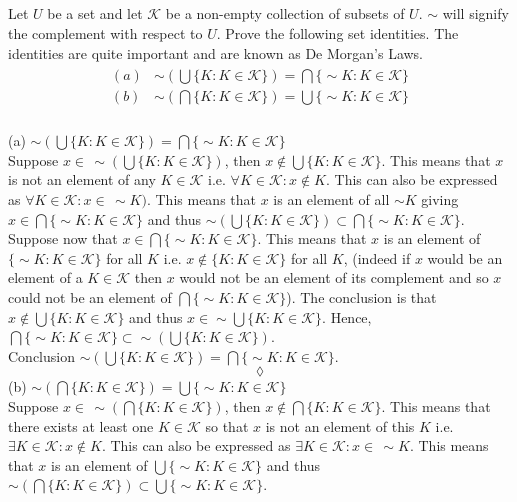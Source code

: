 \subsection{}
\begin{tcolorbox}
Let $U$ be a set and let $\mathscr{K}$ be a non-empty collection of subsets of $U$. $\sim$ will signify the complement with respect to $U$. Prove the following set identities. The identities are quite important and are known as De Morgan's Laws.
\begin{align*}
\begin{array}{ll}
(a)&\sim(\bigcup \{K:K\in \mathscr{K}\}) = \bigcap\{\sim K:K\in \mathscr{K}\}\\
(b)&\sim(\bigcap \{K:K\in \mathscr{K}\}) = \bigcup\{\sim K:K\in \mathscr{K}\}\\
\end{array}
\end{align*} 
\end{tcolorbox}
(a) $\sim(\bigcup \{K:K\in \mathscr{K}\}) = \bigcap\{\sim K:K\in \mathscr{K}\}$\\
Suppose $x\in\,  \sim(\bigcup \{K:K\in \mathscr{K}\})$, then $x\not\in \bigcup \{K:K\in \mathscr{K}\}$. This means that $x$ is not an element of any $K\in \mathscr{K}$ i.e. $\forall K\in \mathscr{K}: x\not\in K$. This can also be expressed as  $\forall K\in \mathscr{K}: x\in\, \sim K)$. This means that $x$ is an element of all $\sim K$ giving $x\in \bigcap\{\sim K:K\in \mathscr{K}\}$ and thus $\sim(\bigcup \{K:K\in \mathscr{K}\}) \subset \bigcap\{\sim K:K\in \mathscr{K}\}$.\\
Suppose now that $x\in \bigcap\{\sim K:K\in \mathscr{K}\}$. This means that $x$ is an element of  $\{\sim K: K\in \mathscr{K}\}$ for all $K$ i.e. $x\not \in \{K: K\in \mathscr{K}\}$ for all $K$, (indeed if $x$ would be an element of a $K\in  \mathscr{K}$ then $x$ would not be an element of its complement and so $x$ could not be an element of $\bigcap\{\sim K:K\in \mathscr{K}\}$). The conclusion is that $x\not\in \bigcup \{K:K\in \mathscr{K}\}$ and thus $x\in \sim\bigcup \{K:K\in \mathscr{K}\}$. Hence, $\bigcap\{\sim K:K\in \mathscr{K}\}\subset \sim(\bigcup \{K:K\in \mathscr{K}\})$. \\
Conclusion $\sim(\bigcup \{K:K\in \mathscr{K}\}) = \bigcap\{\sim K:K\in \mathscr{K}\}$.
$$\lozenge$$
(b) $\sim(\bigcap \{K:K\in \mathscr{K}\}) = \bigcup\{\sim K:K\in \mathscr{K}\}$\\
Suppose $x\in\,  \sim(\bigcap \{K:K\in \mathscr{K}\})$, then $x\not\in \bigcap \{K:K\in \mathscr{K}\}$. This means that there exists at least one $K\in \mathscr{K}$ so that $x$ is not an element of this  $K$ i.e. $\exists K\in \mathscr{K}: x\not\in K$. This can also be expressed as  $\exists K\in \mathscr{K}: x\in\, \sim K$. This means that $x$ is an element of  $\bigcup\{\sim K:K\in \mathscr{K}\}$ and thus $\sim(\bigcap \{K:K\in \mathscr{K}\}) \subset \bigcup\{\sim K:K\in \mathscr{K}\}$. \\
